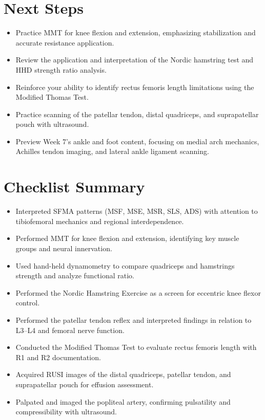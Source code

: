 \section*{Next Steps}

\begin{itemize}
  \item Practice MMT for knee flexion and extension, emphasizing stabilization and accurate resistance application.
  \item Review the application and interpretation of the Nordic hamstring test and HHD strength ratio analysis.
  \item Reinforce your ability to identify rectus femoris length limitations using the Modified Thomas Test.
  \item Practice scanning of the patellar tendon, distal quadriceps, and suprapatellar pouch with ultrasound.
  \item Preview Week 7’s ankle and foot content, focusing on medial arch mechanics, Achilles tendon imaging, and lateral ankle ligament scanning.
\end{itemize}

\section*{Checklist Summary}

\begin{itemize}
  \item [$\square$] Interpreted SFMA patterns (MSF, MSE, MSR, SLS, ADS) with attention to tibiofemoral mechanics and regional interdependence.
  \item [$\square$] Performed MMT for knee flexion and extension, identifying key muscle groups and neural innervation.
  \item [$\square$] Used hand-held dynamometry to compare quadriceps and hamstrings strength and analyze functional ratio.
  \item [$\square$] Performed the Nordic Hamstring Exercise as a screen for eccentric knee flexor control.
  \item [$\square$] Performed the patellar tendon reflex and interpreted findings in relation to L3–L4 and femoral nerve function.
  \item [$\square$] Conducted the Modified Thomas Test to evaluate rectus femoris length with R1 and R2 documentation.
  \item [$\square$] Acquired RUSI images of the distal quadriceps, patellar tendon, and suprapatellar pouch for effusion assessment.
  \item [$\square$] Palpated and imaged the popliteal artery, confirming pulsatility and compressibility with ultrasound.
\end{itemize}

